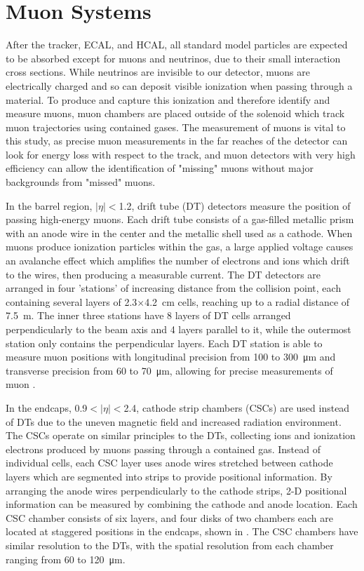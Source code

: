 \section{Muon Systems}
After the tracker, ECAL, and HCAL, all standard model particles are expected to be absorbed except for muons and neutrinos, due to their small interaction cross sections.
While neutrinos are invisible to our detector, muons are electrically charged and so can deposit visible ionization when passing through a material.
To produce and capture this ionization and therefore identify and measure muons, muon chambers are placed outside of the solenoid which track muon trajectories using contained gases.
The measurement of muons is vital to this study, as precise muon measurements in the far reaches of the detector can look for energy loss with respect to the track, and muon detectors with very high efficiency can allow the identification of "missing" muons without major backgrounds from "missed" muons.

In the barrel region, $\lvert\eta\rvert<$1.2, drift tube (DT) detectors measure the position of passing high-energy muons. 
Each drift tube consists of a gas-filled metallic prism with an anode wire in the center and the metallic shell used as a cathode.
When muons produce ionization particles within the gas, a large applied voltage causes an avalanche effect which amplifies the number of electrons and ions which drift to the wires, then producing a measurable current.
The DT detectors are arranged in four 'stations' of increasing distance from the collision point, each containing several layers of 2.3$\times$\SI{4.2}{\centi\meter} cells, reaching up to a radial distance of \SI{7.5}{\meter}. 
The inner three stations have 8 layers of DT cells arranged perpendicularly to the beam axis and 4 layers parallel to it, while the outermost station only contains the perpendicular layers.
Each DT station is able to measure muon positions with longitudinal precision from 100 to \SI{300}{\micro\meter} and transverse precision from  60 to \SI{70}{\micro\meter}, allowing for precise measurements of muon \pt. 

In the endcaps, 0.9$<\lvert\eta\rvert<$2.4, cathode strip chambers (CSCs) are used instead of DTs due to the uneven magnetic field and increased radiation environment.
The CSCs operate on similar principles to the DTs, collecting ions and ionization electrons produced by muons passing through a contained gas. 
Instead of individual cells, each CSC layer uses anode wires stretched between cathode layers which are segmented into strips to provide positional information. 
By arranging the anode wires perpendicularly to the cathode strips, 2-D positional information can be measured by combining the cathode and anode location. 
Each CSC chamber consists of six layers, and four disks of two chambers each are located at staggered positions in the endcaps, shown in . 
The CSC chambers have similar resolution to the DTs, with the spatial resolution from each chamber ranging from 60 to \SI{120}{\micro\meter}.

